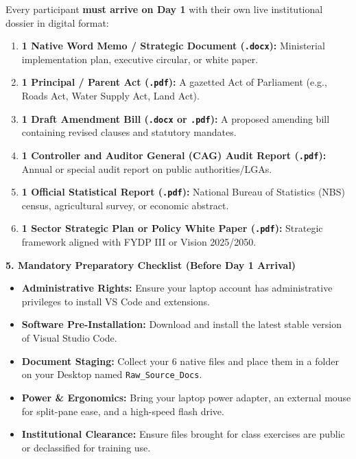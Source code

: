 \documentclass[10pt, a4paper]{article}
\begin{document}
\noindent Every participant \textbf{must arrive on Day 1} with their own live institutional dossier in digital format:
\begin{enumerate}
    \item \textbf{1 Native Word Memo / Strategic Document (\texttt{.docx}):} Ministerial implementation plan, executive circular, or white paper.
    \item \textbf{1 Principal / Parent Act (\texttt{.pdf}):} A gazetted Act of Parliament (e.g., Roads Act, Water Supply Act, Land Act).
    \item \textbf{1 Draft Amendment Bill (\texttt{.docx} or \texttt{.pdf}):} A proposed amending bill containing revised clauses and statutory mandates.
    \item \textbf{1 Controller and Auditor General (CAG) Audit Report (\texttt{.pdf}):} Annual or special audit report on public authorities/LGAs.
    \item \textbf{1 Official Statistical Report (\texttt{.pdf}):} National Bureau of Statistics (NBS) census, agricultural survey, or economic abstract.
    \item \textbf{1 Sector Strategic Plan or Policy White Paper (\texttt{.pdf}):} Strategic framework aligned with FYDP III or Vision 2025/2050.
\end{enumerate}

\newpage

\noindent\textbf{\textcolor{tanzaniablue}{\large 5. Mandatory Preparatory Checklist (Before Day 1 Arrival)}}
\vspace{0.1cm}
\begin{itemize}
    \item[\textbf{[ \ ]}] \textbf{Administrative Rights:} Ensure your laptop account has administrative privileges to install VS Code and extensions.
    \item[\textbf{[ \ ]}] \textbf{Software Pre-Installation:} Download and install the latest stable version of Visual Studio Code.
    \item[\textbf{[ \ ]}] \textbf{Document Staging:} Collect your 6 native files and place them in a folder on your Desktop named \texttt{Raw\_Source\_Docs}.
    \item[\textbf{[ \ ]}] \textbf{Power \& Ergonomics:} Bring your laptop power adapter, an external mouse for split-pane ease, and a high-speed flash drive.
    \item[\textbf{[ \ ]}] \textbf{Institutional Clearance:} Ensure files brought for class exercises are public or declassified for training use.
\end{itemize}
\end{document}
